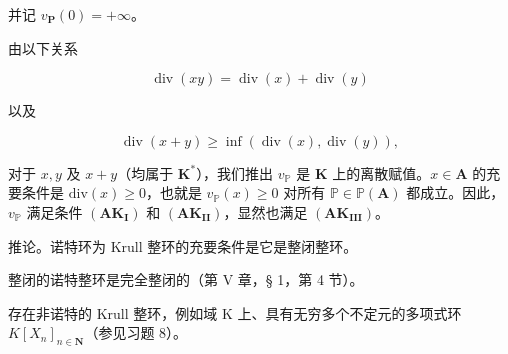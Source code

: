 并记 \(v_{\mathbf{P}}(0) = +\infty\)。

由以下关系

\[
\operatorname{div} (x y) = \operatorname{div} (x) + \operatorname{div} (y)
\]

以及

\[
\operatorname{div} (x + y) \geqslant \inf (\operatorname{div} (x), \operatorname{div} (y)),
\]

对于 \(x, y\) 及 \(x + y\)（均属于 \(\mathbf{K}^*\)），我们推出 \(v_{\mathbb{P}}\) 是 \(\mathbf{K}\) 上的离散赋值。\(x \in \mathbf{A}\) 的充要条件是 \(\mathrm{div}(x) \geqslant 0\)，也就是 \(v_{\mathbb{P}}(x) \geqslant 0\) 对所有 \(\mathbb{P} \in \mathbb{P}(\mathbf{A})\) 都成立。因此，\(v_{\mathbb{P}}\) 满足条件 \((\mathbf{AK}_{\mathbf{I}})\) 和 \((\mathbf{AK}_{\mathbf{II}})\)，显然也满足 \((\mathbf{AK}_{\mathbf{III}})\)。

推论。诺特环为 Krull 整环的充要条件是它是整闭整环。

整闭的诺特整环是完全整闭的（第 V 章，§ 1，第 4 节）。

存在非诺特的 Krull 整环，例如域 K 上、具有无穷多个不定元的多项式环 \(K[X_{n}]_{n\in\mathbf{N}}\)（参见习题 8）。

